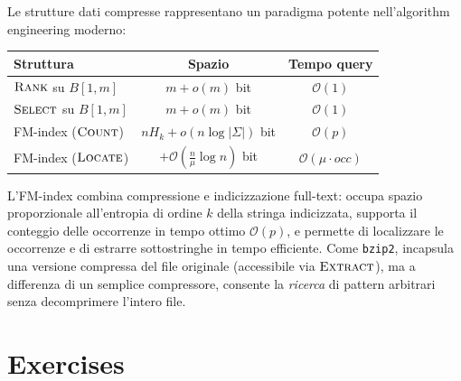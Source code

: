 \documentclass[12pt, a4paper, oneside]{book}
\theoremstyle{plain}
\theoremstyle{definition}
\theoremstyle{remark}
\newcommand{\OO}[1]{\mathcal{O}\!\left(#1\right)}
\newcommand{\Hk}{H_k}
\begin{document}
Le strutture dati compresse rappresentano un paradigma potente nell'algorithm engineering moderno:

\begin{center}
\begin{tabular}{lcc}
\hline
\textbf{Struttura} & \textbf{Spazio} & \textbf{Tempo query} \\
\hline
$\textsc{Rank}$ su $B[1,m]$ & $m + o(m)$ bit & $\OO{1}$ \\
$\textsc{Select}$ su $B[1,m]$ & $m + o(m)$ bit & $\OO{1}$ \\
FM-index ($\textsc{Count}$) & $n\Hk + o(n \log |\Sigma|)$ bit & $\OO{p}$ \\
FM-index ($\textsc{Locate}$) & $+ \OO{\frac{n}{\mu} \log n}$ bit & $\OO{\mu \cdot occ}$ \\
\hline
\end{tabular}
\end{center}

L'FM-index combina compressione e indicizzazione full-text: occupa spazio proporzionale all'entropia di ordine $k$ della stringa indicizzata, supporta il conteggio delle occorrenze in tempo ottimo $\OO{p}$, e permette di localizzare le occorrenze e di estrarre sottostringhe in tempo efficiente. Come \texttt{bzip2}, incapsula una versione compressa del file originale (accessibile via $\textsc{Extract}$), ma a differenza di un semplice compressore, consente la \emph{ricerca} di pattern arbitrari senza decomprimere l'intero file.

\section{Exercises}
\end{document}
